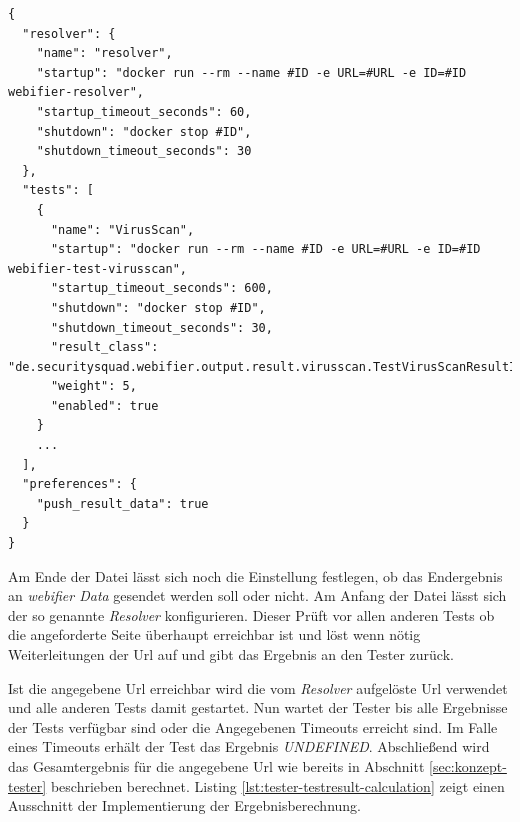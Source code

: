\begin{scriptsize}
\begin{lstlisting}
{
  "resolver": {
    "name": "resolver",
    "startup": "docker run --rm --name #ID -e URL=#URL -e ID=#ID webifier-resolver",
    "startup_timeout_seconds": 60,
    "shutdown": "docker stop #ID",
    "shutdown_timeout_seconds": 30
  },
  "tests": [
    {
      "name": "VirusScan",
      "startup": "docker run --rm --name #ID -e URL=#URL -e ID=#ID webifier-test-virusscan",
      "startup_timeout_seconds": 600,
      "shutdown": "docker stop #ID",
      "shutdown_timeout_seconds": 30,
      "result_class": "de.securitysquad.webifier.output.result.virusscan.TestVirusScanResultInfo",
      "weight": 5,
      "enabled": true
    }
    ...
  ],
  "preferences": {
    "push_result_data": true
  }
}
\end{lstlisting}
\end{scriptsize}

Am Ende der Datei lässt sich noch die Einstellung festlegen, ob das Endergebnis an \textit{webifier
Data} gesendet werden soll oder nicht. Am Anfang der Datei lässt sich der so genannte
\textit{Resolver} konfigurieren. Dieser Prüft vor allen anderen Tests ob die angeforderte Seite überhaupt erreichbar ist und löst wenn nötig Weiterleitungen der Url auf und gibt das Ergebnis an den Tester zurück.

Ist die angegebene Url erreichbar wird die vom \textit{Resolver} aufgelöste Url verwendet und alle anderen Tests damit gestartet. Nun wartet der Tester bis alle Ergebnisse der Tests verfügbar sind oder die Angegebenen Timeouts erreicht sind. Im Falle eines Timeouts erhält der Test das Ergebnis \textit{UNDEFINED}. Abschließend wird das Gesamtergebnis für die angegebene Url wie bereits in Abschnitt \ref{sec:konzept-tester} beschrieben berechnet. Listing \ref{lst:tester-testresult-calculation} zeigt einen Ausschnitt der Implementierung der Ergebnisberechnung.

